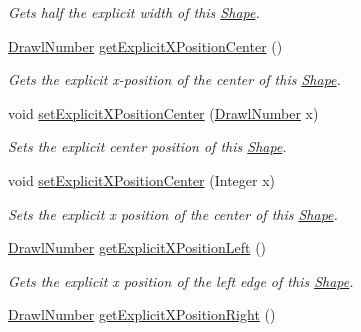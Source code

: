 \begin{DoxyCompactItemize}
\begin{DoxyCompactList}\small\item\em Gets half the explicit width of this \hyperlink{classcom_1_1aarrelaakso_1_1drawl_1_1_shape}{Shape}. \end{DoxyCompactList}\item 
\hyperlink{classcom_1_1aarrelaakso_1_1drawl_1_1_drawl_number}{Drawl\+Number} \hyperlink{classcom_1_1aarrelaakso_1_1drawl_1_1_shape_aaecae2f51794b77ff2f76b1be64b0d90}{get\+Explicit\+X\+Position\+Center} ()
\begin{DoxyCompactList}\small\item\em Gets the explicit x-\/position of the center of this \hyperlink{classcom_1_1aarrelaakso_1_1drawl_1_1_shape}{Shape}. \end{DoxyCompactList}\item 
void \hyperlink{classcom_1_1aarrelaakso_1_1drawl_1_1_shape_a43d67e2711163383c32d8c14a6b17e2c}{set\+Explicit\+X\+Position\+Center} (\hyperlink{classcom_1_1aarrelaakso_1_1drawl_1_1_drawl_number}{Drawl\+Number} x)
\begin{DoxyCompactList}\small\item\em Sets the explicit center position of this \hyperlink{classcom_1_1aarrelaakso_1_1drawl_1_1_shape}{Shape}. \end{DoxyCompactList}\item 
void \hyperlink{classcom_1_1aarrelaakso_1_1drawl_1_1_shape_aa7855df6d98b3bfa556b7d857755181b}{set\+Explicit\+X\+Position\+Center} (Integer x)
\begin{DoxyCompactList}\small\item\em Sets the explicit x position of the center of this \hyperlink{classcom_1_1aarrelaakso_1_1drawl_1_1_shape}{Shape}. \end{DoxyCompactList}\item 
\hyperlink{classcom_1_1aarrelaakso_1_1drawl_1_1_drawl_number}{Drawl\+Number} \hyperlink{classcom_1_1aarrelaakso_1_1drawl_1_1_shape_a339cf8811f57b7cb5251109b04be953c}{get\+Explicit\+X\+Position\+Left} ()
\begin{DoxyCompactList}\small\item\em Gets the explicit x position of the left edge of this \hyperlink{classcom_1_1aarrelaakso_1_1drawl_1_1_shape}{Shape}. \end{DoxyCompactList}\item 
\hyperlink{classcom_1_1aarrelaakso_1_1drawl_1_1_drawl_number}{Drawl\+Number} \hyperlink{classcom_1_1aarrelaakso_1_1drawl_1_1_shape_a19970b658b55e4e61de31aaaef8cf7fe}{get\+Explicit\+X\+Position\+Right} ()

\end{DoxyCompactItemize}
